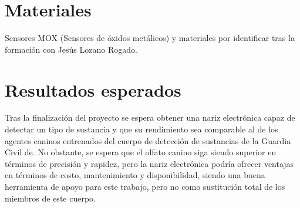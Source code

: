 \documentclass[12pt,a4paper,oneside]{report}
\begin{document}
\section{Materiales}
Sensores MOX (Sensores de óxidos metálicos) y materiales por identificar tras la formación con Jesús Lozano Rogado.

\section{Resultados esperados}
Tras la finalización del proyecto se espera obtener una nariz electrónica capaz de detectar un tipo de sustancia y que su rendimiento sea comparable al de los agentes caninos entrenados del cuerpo de detección de sustancias de la Guardia Civil de.
No obstante, se espera que el olfato canino siga siendo superior en términos de precisión y rapidez, pero la nariz electrónica podría ofrecer ventajas en términos de costo, mantenimiento y disponibilidad, siendo una buena herramienta de apoyo para este trabajo, pero no como sustitución total de los miembros de este cuerpo.
\end{document}
